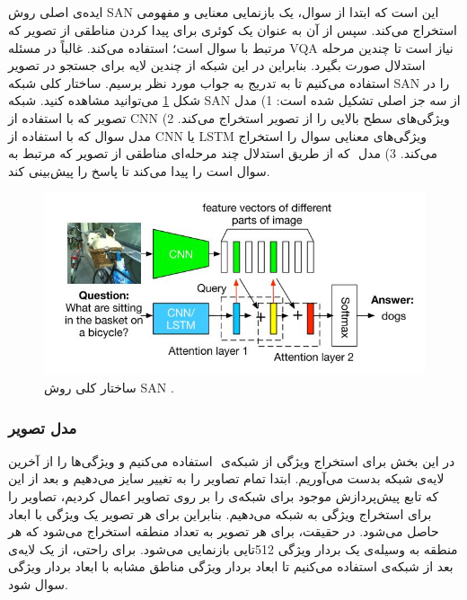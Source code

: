 {	\subsection{ \cite{yang2016stacked} }
	{
		ایده‌ی اصلی روش SAN‌ این است که ابتدا از سوال، یک  بازنمایی معنایی و مفهومی استخراج می‌کند. سپس از آن به عنوان یک کوئری برای پیدا کردن مناطقی از تصویر که مرتبط با سوال است؛ استفاده می‌کند. غالباً در مسئله VQA نیاز است تا چندین مرحله استدلال صورت بگیرد. بنابراین در این شبکه از چندین لایه برای جستجو در تصویر استفاده می‌کنیم تا به تدریج به جواب مورد نظر برسیم. ساختار کلی شبکه SAN را در شکل 
		\ref{fig:1}
		می‌توانید مشاهده کنید. شبکه SAN از سه جز اصلی تشکیل شده است: 1) مدل تصویر که با استفاده از CNN ویژگی‌های سطح بالایی را از تصویر استخراج می‌کند. 2) مدل سوال که با استفاده از CNN یا LSTM ویژگی‌های معنایی سوال را استخراج می‌کند. 3) مدل
		 ‌ که از طریق استدلال چند مرحله‌ای مناطقی از تصویر که مرتبط به سوال است را پیدا می‌کند تا پاسخ را پیش‌بینی کند.
		\begin{figure}
			\centering
			\includegraphics[scale=0.5]{images/san.jpg}
			\caption{ساختار کلی روش SAN .}
			\label{fig:1}
		\end{figure}
	
		\subsubsection{مدل تصویر}
		{
			در این بخش برای استخراج ویژگی از شبکه‌ی
			 ‌ استفاده می‌کنیم و ویژگی‌ها را از آخرین لایه‌ی
			  ‌شبکه بدست می‌آوریم. ابتدا تمام تصاویر را به
			  تغییر سایز می‌دهیم و بعد از این که تابع پیش‌پردازش موجود برای شبکه‌ی 
			   را بر روی تصاویر اعمال کردیم، تصاویر را برای استخراج ویژگی به شبکه می‌دهیم. بنابراین برای هر تصویر یک ویژگی با ابعاد
			 حاصل می‌شود. در حقیقت، برای هر تصویر به تعداد
			 منطقه استخراج می‌شود که هر منطقه به وسیله‌ی یک بردار ویژگی 512تایی بازنمایی می‌شود. برای راحتی، از یک لایه‌ی
			 بعد از شبکه‌ی 
			استفاده می‌کنیم تا ابعاد بردار ویژگی مناطق مشابه با ابعاد بردار ویژگی سوال شود.
		}
	
}}
